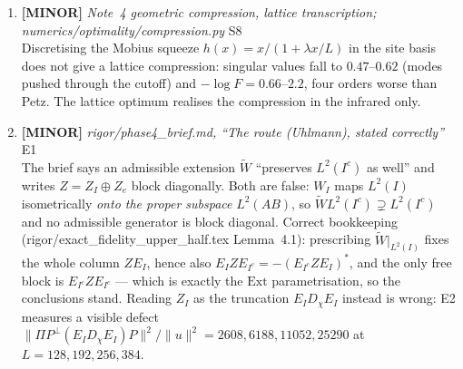 \documentclass[11pt]{article}
\begin{document}
\begin{enumerate}[leftmargin=1.6em,itemsep=6pt]
\item \textbf{[MINOR]} \emph{Note~4 geometric compression, lattice transcription; numerics/optimality/compression.py} \hfill\textsc{S8}\\ Discretising the Mobius squeeze \(h(x)=x/(1+\lambda x/L)\) in the site basis does not give a lattice compression: singular values fall to \(0.47\)--\(0.62\) (modes pushed through the cutoff) and \(-\log F=0.66\)--\(2.2\), four orders worse than Petz. The lattice optimum realises the compression in the infrared only.
\item \textbf{[MINOR]} \emph{rigor/phase4\_brief.md, ``The route (Uhlmann), stated correctly''} \hfill\textsc{E1}\\ The brief says an admissible extension \(\widetilde W\) ``preserves \(L^2(I^c)\) as well'' and writes \(Z=Z_I\oplus Z_e\) block diagonally. Both are false: \(W_I\) maps \(L^2(I)\) isometrically \emph{onto the proper subspace} \(L^2(AB)\), so \(\widetilde W L^2(I^c)\supsetneq L^2(I^c)\) and no admissible generator is block diagonal. Correct bookkeeping (rigor/exact\_fidelity\_upper\_half.tex Lemma~4.1): prescribing \(\widetilde W|_{L^2(I)}\) fixes the whole column \(ZE_I\), hence also \(E_IZE_{I^c}=-(E_{I^c}ZE_I)^{*}\), and the only free block is \(E_{I^c}ZE_{I^c}\) --- which is exactly the \(\mathrm{Ext}\) parametrisation, so the conclusions stand. Reading \(Z_I\) as the truncation \(E_ID_\chi E_I\) instead is wrong: E2 measures a visible defect \(\lVert\Pi P^{\perp}(E_ID_\chi E_I)P\rVert^2/\lVert u\rVert^2=2608,6188,11052,25290\) at \(L=128,192,256,384\).

\end{enumerate}
\end{document}
